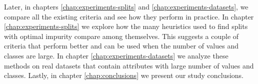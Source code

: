 Later, in chapters \ref{chap:experiments-splits} and \ref{chap:experiments-datasets}, we compare all the existing criteria and see how they perform in practice. In chapter \ref{chap:experiments-splits} we explore how the many heuristics used to find splits with optimal impurity compare among themselves. This suggests a couple of criteria that perform better and can be used when the number of values and classes are large. In chapter \ref{chap:experiments-datasets} we analyze these methods on real datasets that contain attributes with large number of values and classes. Lastly, in chapter \ref{chap:conclusions} we present our study conclusions.